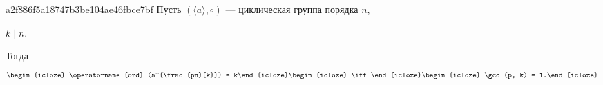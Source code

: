 \begin{note}{a2f886f5a18747b3be104ae46fbce7bf}
    Пусть \({ (\langle a \rangle, \circ) }\) --- циклическая группа порядка \({ n }\),\: \begin{icloze}{4}\({ k \mid n }\).\end{icloze}
    Тогда
    \[
        \begin{icloze}{3}\operatorname{ord} (a^{\frac{pn}{k}}) = k\end{icloze} \begin{icloze}{2}\iff\end{icloze} \begin{icloze}{1}\gcd(p, k) = 1.\end{icloze}
    \]
\end{note}



